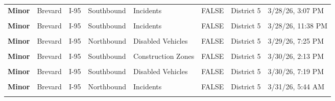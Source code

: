 \documentclass[
]{article}
\begin{document}
\begin{longtable}[t]{>{\raggedright\arraybackslash}p{1.5cm}>{\raggedright\arraybackslash}p{2.5cm}>{\raggedright\arraybackslash}p{3cm}>{\raggedright\arraybackslash}p{1.8cm}>{\raggedright\arraybackslash}p{2.5cm}lll}
\addlinespace
\textbf{Minor} & Brevard & I-95 & Southbound & Incidents & FALSE & District 5 & 3/28/26, 3:07 PM\\
\textbf{\cellcolor{gray!10}{Minor}} & \cellcolor{gray!10}{Brevard} & \cellcolor{gray!10}{I-95} & \cellcolor{gray!10}{Southbound} & \cellcolor{gray!10}{Disabled Vehicles} & \cellcolor{gray!10}{FALSE} & \cellcolor{gray!10}{District 5} & \cellcolor{gray!10}{3/28/26, 10:31 PM}\\
\textbf{Minor} & Brevard & I-95 & Southbound & Incidents & FALSE & District 5 & 3/28/26, 11:38 PM\\
\textbf{\cellcolor{gray!10}{Minor}} & \cellcolor{gray!10}{Brevard} & \cellcolor{gray!10}{I-95} & \cellcolor{gray!10}{Southbound} & \cellcolor{gray!10}{Disabled Vehicles} & \cellcolor{gray!10}{FALSE} & \cellcolor{gray!10}{District 5} & \cellcolor{gray!10}{3/29/26, 5:42 AM}\\
\textbf{Minor} & Brevard & I-95 & Northbound & Disabled Vehicles & FALSE & District 5 & 3/29/26, 7:25 PM\\
\addlinespace
\textbf{\cellcolor{gray!10}{Minor}} & \cellcolor{gray!10}{Brevard} & \cellcolor{gray!10}{I-95} & \cellcolor{gray!10}{Southbound} & \cellcolor{gray!10}{Incidents} & \cellcolor{gray!10}{FALSE} & \cellcolor{gray!10}{District 5} & \cellcolor{gray!10}{3/29/26, 8:37 PM}\\
\textbf{Minor} & Brevard & I-95 & Southbound & Construction Zones & FALSE & District 5 & 3/30/26, 2:13 PM\\
\textbf{\cellcolor{gray!10}{Minor}} & \cellcolor{gray!10}{Brevard} & \cellcolor{gray!10}{I-95} & \cellcolor{gray!10}{Southbound} & \cellcolor{gray!10}{Disabled Vehicles} & \cellcolor{gray!10}{FALSE} & \cellcolor{gray!10}{District 5} & \cellcolor{gray!10}{3/30/26, 2:34 PM}\\
\textbf{Minor} & Brevard & I-95 & Southbound & Disabled Vehicles & FALSE & District 5 & 3/30/26, 7:19 PM\\
\textbf{\cellcolor{gray!10}{Minor}} & \cellcolor{gray!10}{Brevard} & \cellcolor{gray!10}{I-95} & \cellcolor{gray!10}{Northbound} & \cellcolor{gray!10}{Disabled Vehicles} & \cellcolor{gray!10}{FALSE} & \cellcolor{gray!10}{District 5} & \cellcolor{gray!10}{3/31/26, 12:47 AM}\\
\addlinespace
\textbf{Minor} & Brevard & I-95 & Northbound & Incidents & FALSE & District 5 & 3/31/26, 5:44 AM\\
\textbf{\cellcolor{gray!10}{Minor}} & \cellcolor{gray!10}{Brevard} & \cellcolor{gray!10}{I-95} & \cellcolor{gray!10}{Southbound} & \cellcolor{gray!10}{Disabled Vehicles} & \cellcolor{gray!10}{FALSE} & \cellcolor{gray!10}{District 5} & \cellcolor{gray!10}{3/31/26, 10:43 PM}\\

\end{longtable}
\end{document}
